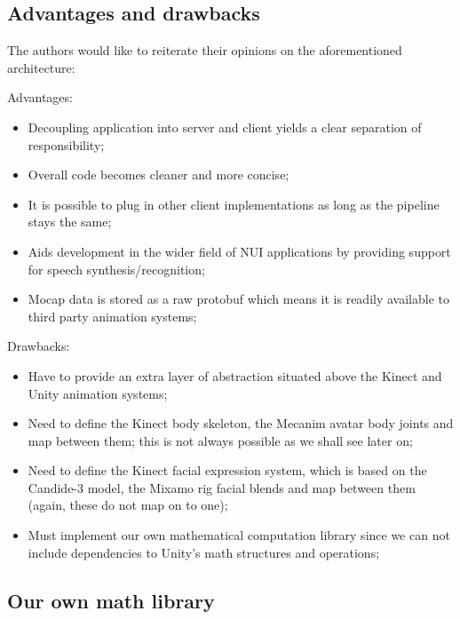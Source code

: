 \documentclass[a4paper, 12pt]{amsart}
\begin{document}
\subsection{Advantages and drawbacks}

The authors would like to reiterate their opinions on the aforementioned architecture:

Advantages:

\begin{itemize}
\item Decoupling application into server and client yields a clear separation of responsibility;
\item Overall code becomes cleaner and more concise;
\item It is possible to plug in other client implementations as long as the pipeline stays the same;
\item Aids development in the wider field of NUI applications by providing support for speech synthesis/recognition;
\item Mocap data is stored as a raw protobuf which means it is readily available to third party animation systems;
\end{itemize}

Drawbacks:

\begin{itemize}
\item Have to provide an extra layer of abstraction situated above the Kinect and Unity animation systems;
\item Need to define the Kinect body skeleton, the Mecanim avatar body joints and map between them; this is not always possible as we shall see later on;
\item Need to define the Kinect facial expression system, which is based on the Candide-3 model, the Mixamo rig facial blends and map between them (again, these do not map on to one);
\item Must implement our own mathematical computation library since we can not include dependencies to Unity's math structures and operations;
\end{itemize}

\subsection{Our own math library}
\end{document}
